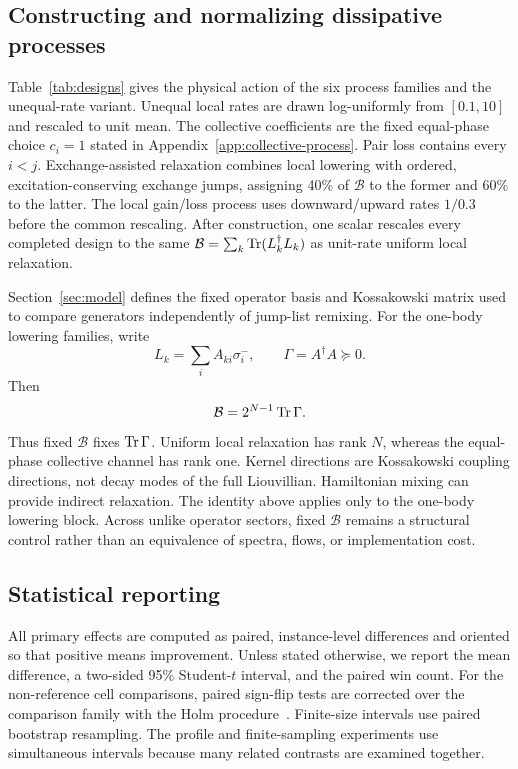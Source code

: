 \subsection{Constructing and normalizing dissipative processes}

Table~\ref{tab:designs} gives the physical action of the six process families
and the unequal-rate variant.  Unequal local rates are drawn log-uniformly
from \([0.1,10]\) and rescaled to unit mean.  The collective coefficients are
the fixed equal-phase choice \(c_i=1\) stated in
Appendix~\ref{app:collective-process}.  Pair loss contains every \(i<j\).
Exchange-assisted relaxation combines local lowering with ordered,
excitation-conserving exchange jumps, assigning 40\% of \(\mathcal B\) to
the former and 60\% to the latter.  The local gain/loss process uses
downward/upward rates \(1/0.3\) before the common rescaling.  After
construction, one scalar rescales every completed design to the same
\(\mathcal B=\sum_k\operatorname{Tr}(L_k^\dagger L_k)\) as unit-rate uniform local
relaxation.

Section~\ref{sec:model} defines the fixed operator basis and Kossakowski matrix
used to compare generators independently of jump-list remixing. For the
one-body lowering families, write
\[
L_k=\sum_i A_{ki}\sigma_i^-,
\qquad
\Gamma=A^\dagger A\succeq0 .
\]
Then
\[
\mathcal B=2^{N-1}\operatorname{Tr}\Gamma .
\]
Thus fixed \(\mathcal B\) fixes \(\operatorname{Tr}\Gamma\). Uniform local relaxation has
rank \(N\), whereas the equal-phase collective channel has rank one. Kernel
directions are Kossakowski coupling directions, not decay modes of the full
Liouvillian. Hamiltonian mixing can provide indirect relaxation. The identity
above applies only to the one-body lowering block. Across unlike operator
sectors, fixed \(\mathcal B\) remains a structural control rather than an
equivalence of spectra, flows, or implementation cost.

\subsection{Statistical reporting}

All primary effects are computed as paired, instance-level differences and
oriented so that positive means improvement.  Unless stated otherwise, we
report the mean difference, a two-sided 95\% Student-\(t\) interval, and the
paired win count. For the non-reference cell comparisons, paired sign-flip
tests are corrected over the comparison family
with the Holm procedure~\cite{Holm1979}. Finite-size intervals use paired
bootstrap resampling. The profile and finite-sampling experiments use
simultaneous intervals because many related contrasts are examined together.

